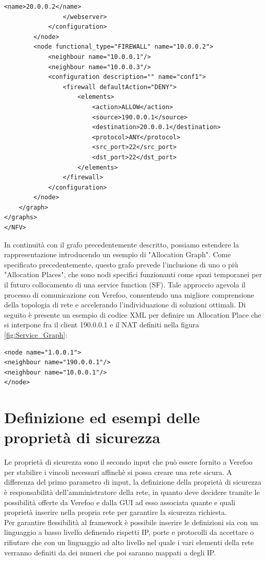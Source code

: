 \begin{lstlisting}[style=mystyle,caption={Definizione nodi del ServiceGraph \ref*{fig:Service_Graph}}]
                    <name>20.0.0.2</name>
                </webserver>
            </configuration>
        </node>
        <node functional_type="FIREWALL" name="10.0.0.2">
            <neighbour name="10.0.0.1"/>
            <neighbour name="10.0.0.3"/>
            <configuration description="" name="conf1">
                <firewall defaultAction="DENY">
                    <elements>
                        <action>ALLOW</action>
                        <source>190.0.0.1</source>
                        <destination>20.0.0.1</destination>
                        <protocol>ANY</protocol>
                        <src_port>22</src_port>
                        <dst_port>22</dst_port>
                    </elements>
                </firewall>
            </configuration>
        </node>
    </graph>
</graphs>
</NFV>
\end{lstlisting}

In continuità con il grafo precedentemente descritto, possiamo estendere la rappresentazione introducendo un esempio di "Allocation Graph". 
Come specificato precedentemente, questo grafo prevede l'inclusione di uno o più "Allocation Places", che sono nodi specifici funzionanti come spazi temporanei per il futuro collocamento di una service function (SF). 
Tale approccio agevola il processo di comunicazione con Verefoo, consentendo una migliore comprensione della topologia di rete e accelerando l'individuazione di soluzioni ottimali. 
Di seguito è presente un esempio di codice XML per definire un Allocation Place che si interpone fra il client 190.0.0.1 e il NAT definiti nella figura \ref{fig:Service_Graph}: 

\begin{lstlisting}[style=mystyle,caption={Definizione Allocation Place per Allocation Graph}]
<node name="1.0.0.1">
<neighbour name="190.0.0.1"/>
<neighbour name="10.0.0.1"/>
</node>
\end{lstlisting}

\newpage

\section{Definizione ed esempi delle proprietà di sicurezza}

Le proprietà di sicurezza sono il secondo input che può essere fornito a Verefoo per stabilire i vincoli necessari affinchè
si possa creare una rete sicura. A differenza del primo parametro di input, la definizione della proprietà di sicurezza è 
responsabilità dell'amministratore della rete, in quanto deve decidere tramite le possibilità offerte da Verefoo e dalla GUI ad esso associata
quante e quali proprietà inserire nella propria rete per garantire la sicurezza richiesta.\\
Per garantire flessibilità al framework è possibile inserire le definizioni sia con un linguaggio a basso livello definendo rispetti IP, porte e protocolli
da accettare o rifiutare che con un linguaggio ad alto livello nel quale i vari elementi della rete verranno definiti da dei numeri che poi saranno mappati a degli IP.

